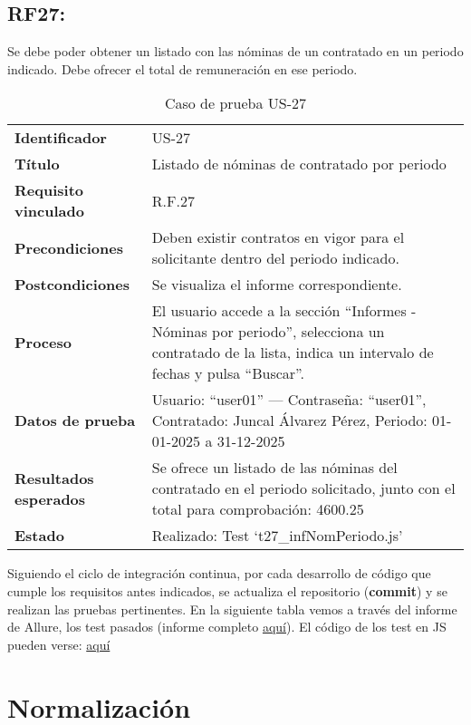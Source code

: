 \subsection*{RF27:} Se debe poder obtener un listado con las nóminas de un contratado en un periodo indicado. Debe ofrecer el total de remuneración en ese periodo.
\begin{table}[H]
	\centering
	\small
	\caption{Caso de prueba US-27}
	\label{tab:caso_uso27}
	\begin{tabular}{>{\bfseries}l p{11cm}}
		Identificador & US-27 \\
		Título & Listado de nóminas de contratado por periodo \\
		Requisito vinculado & R.F.27 \\
		Precondiciones & Deben existir contratos en vigor para el solicitante dentro del periodo indicado. \\
		Postcondiciones & Se visualiza el informe correspondiente. \\
		Proceso & El usuario accede a la sección “Informes - Nóminas por periodo”, selecciona un contratado de la lista, indica un intervalo de fechas y pulsa “Buscar”. \\
		Datos de prueba & Usuario: “user01” — Contraseña: “user01”, Contratado: Juncal Álvarez Pérez, Periodo: 01-01-2025 a 31-12-2025 \\
		Resultados esperados & Se ofrece un listado de las nóminas del contratado en el periodo solicitado, junto con el total para comprobación: 4600.25 \\
		Estado & Realizado: Test `t27\_infNomPeriodo.js' \\
	\end{tabular}
\end{table}


Siguiendo el ciclo de integración continua, por cada desarrollo de código que cumple los requisitos antes indicados, se actualiza el repositorio (\textbf{commit}) y se realizan las pruebas pertinentes. En la siguiente tabla vemos a través del informe de Allure, los test pasados (informe completo \href{https://far0010.github.io/TFGUBU-Fran_Arroyo/informe/#} {aquí}).
El código de los test en \acrshort{JS} pueden verse: \href{https://github.com/far0010/TFGUBU-Fran_Arroyo/tree/main/project-docs/memoria/test}{aquí}

\section{Normalización}

